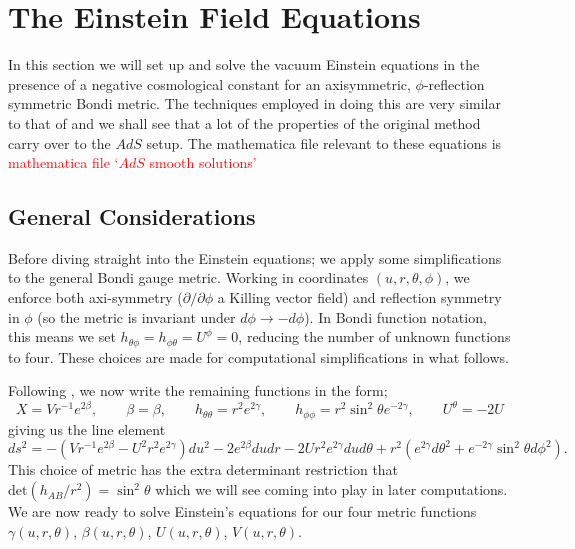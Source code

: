 \documentclass[a4paper,11pt]{article}
\numberwithin{equation}{section}
\begin{document}
\section{The Einstein Field Equations}

In this section we will set up and solve the vacuum Einstein equations in the presence of a negative cosmological constant for an axisymmetric, $\phi$-reflection symmetric Bondi metric. The techniques employed in doing this are very similar to that of \cite{Bondi:1962px} and we shall see that a lot of the properties of the original method carry over to the $AdS$ setup. The mathematica file relevant to these equations is \textcolor{red}{mathematica file `$AdS$ smooth solutions'}

\subsection{General Considerations}
Before diving straight into the Einstein equations; we apply some simplifications to the general Bondi gauge metric. Working in coordinates $(u , r, \theta, \phi)$, we enforce both axi-symmetry ($\partial/\partial \phi$ a Killing vector field) and reflection symmetry in $\phi$ (so the metric is invariant under $d\phi \rightarrow -d\phi$). In Bondi function notation, this means we set $h_{\theta \phi}=h_{\phi \theta}=U^{\phi}=0$, reducing the number of unknown functions to four. These choices are made for computational simplifications in what follows.

Following \cite{Bondi:1962px}, we now write the remaining functions in the form;
\begin{equation}
X=Vr^{-1}e^{2\beta}, \qquad \beta=\beta, \qquad h_{\theta \theta}=r^2e^{2\gamma}, \qquad h_{\phi \phi}=r^2\sin^2\theta e^{-2\gamma}, \qquad U^{\theta}=-2U
\end{equation}
giving us the line element 
\begin{equation}  \label{eq: Bondi_Metric}
ds^2=-(Vr^{-1}e^{2\beta}-U^2r^2e^{2\gamma})du^2-2e^{2\beta}dudr-2Ur^2e^{2\gamma}dud\theta+r^2(e^{2\gamma}d\theta^2+e^{-2\gamma}\sin^2\theta d\phi^2).
\end{equation}
This choice of metric has the extra determinant restriction that $\text{det}(h_{AB}/r^2)=\sin^2\theta$ which we will see coming into play in later computations. We are now ready to solve Einstein's equations for our four metric functions $\gamma(u,r,\theta)$, $\beta(u, r, \theta)$, $U(u,r,\theta)$, $V(u,r,\theta)$. \par
\end{document}
